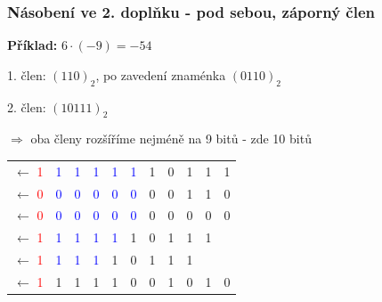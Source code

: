   \begin{frame}
    \frametitle{Násobení ve 2. doplňku - pod sebou, záporný člen}
    \boldmath
    
    \textbf{Příklad:} $6\cdot (-9) = -54$
    
      \vspace{3mm}
      1. člen: $(110)_{2}$, po zavedení znaménka $(0110)_{2}$
      
      2. člen: $(10111)_{2}$
      
      $\Rightarrow$ oba členy rozšíříme nejméně na 9 bitů - zde 10 bitů
      \vspace{10mm}
      \begin{center}
        \begin{tabular}{c | c c c c c c c c c c}
          $\longleftarrow$ \textcolor{red}{1} & \textcolor{blue}{1} & \textcolor{blue}{1} & \textcolor{blue}{1} & \textcolor{blue}{1} & \textcolor{blue}{1} & 1 & 0 & 1 & 1 & 1 \\
          $\longleftarrow$ \textcolor{red}{0} & \textcolor{blue}{0} & \textcolor{blue}{0} & \textcolor{blue}{0} & \textcolor{blue}{0} & \textcolor{blue}{0} & 0 & 0 & 1 & 1 & 0 \\
          \hline
          $\longleftarrow$ \textcolor{red}{0} & \textcolor{blue}{0} & \textcolor{blue}{0} & \textcolor{blue}{0} & \textcolor{blue}{0} & \textcolor{blue}{0} & 0 & 0 & 0 & 0 & 0 \\
          $\longleftarrow$ \textcolor{red}{1} & \textcolor{blue}{1} & \textcolor{blue}{1} & \textcolor{blue}{1} & \textcolor{blue}{1} & 1 & 0 & 1 & 1 & 1 &  \\
          $\longleftarrow$ \textcolor{red}{1} & \textcolor{blue}{1} & \textcolor{blue}{1} & \textcolor{blue}{1} & 1 & 0 & 1 & 1 & 1 &  &  \\
          \hline
          $\longleftarrow$ \textcolor{red}{1} & 1 & 1 & 1 & 1 & 0 & 0 & 1 & 0 & 1 & 0
        \end{tabular}
      \end{center}
    
	\end{frame}
  
